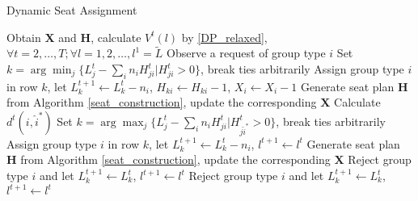 \begin{algorithm}[H]
  \caption{Dynamic Seat Assignment}
  Obtain $\bm{X}$ and $\bm{H}$, calculate $V^{t}(l)$ by \eqref{DP_relaxed}, $\forall t =2, \ldots, T; \forall l = 1,2, \ldots, l^{1}=\tilde{L}$\;
  {Observe a request of group type ${i}$\;
    {
    {Set $k = \arg \min_{j} \{L_j^{t} - \sum_{i}n_i H^{t}_{ji}|H^{t}_{ji} >0\}$, break ties arbitrarily\; 
     Assign group type $i$ in row $k$, let $L_{k}^{t+1} \gets L_{k}^{t}- n_{i}$, $H_{ki} \gets H_{ki}-1$, $X_{i}\gets X_{i}-1$\;
    {Generate seat plan $\bm{H}$ from Algorithm \ref{seat_construction}, update the corresponding $\bm{X}$\;}}
    {Calculate $d^{t}({i}, \hat{i}^{*})$\;
    {Set $k = \arg \max_{j} \{L_j^{t} - \sum_{i}n_i H_{ji}^{t}|H_{j\hat{i}^{*}}^{t} >0\}$, break ties arbitrarily\;
     Assign group type $i$ in row $k$, let $L_{k}^{t+1} \gets L_{k}^{t}- n_{i}$, $l^{t+1} \gets l^{t}$\;
    Generate seat plan $\bm{H}$ from Algorithm \ref{seat_construction}, update the corresponding $\bm{X}$\;}
    {Reject group type ${i}$ and let $L_{k}^{t+1} \gets L_{k}^{t}$, $l^{t+1} \gets l^{t}$\;}}}
    {Reject group type ${i}$ and let $L_{k}^{t+1} \gets L_{k}^{t}$, $l^{t+1} \gets l^{t}$\;}}
\end{algorithm}
